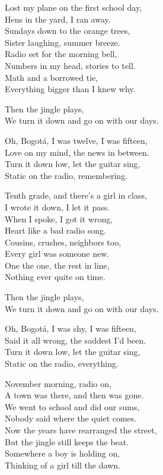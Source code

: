 \begin{lyrics}
Lost my plane on the first school day,\\
Hens in the yard, I ran away.\\
Sundays down to the orange trees,\\
Sister laughing, summer breeze.\\
Radio set for the morning bell,\\
Numbers in my head, stories to tell.\\
Math and a borrowed tie,\\
Everything bigger than I knew why.

Then the jingle plays,\\
We turn it down and go on with our days.

Oh, Bogotá, I was twelve, I was fifteen,\\
Love on my mind, the news in between.\\
Turn it down low, let the guitar sing,\\
Static on the radio, remembering.

Tenth grade, and there’s a girl in class,\\
I wrote it down, I let it pass.\\
When I spoke, I got it wrong,\\
Heart like a bad radio song.\\
Cousins, crushes, neighbors too,\\
Every girl was someone new.\\
One the one, the rest in line,\\
Nothing ever quite on time.

Then the jingle plays,\\
We turn it down and go on with our days.

Oh, Bogotá, I was shy, I was fifteen,\\
Said it all wrong, the saddest I’d been.\\
Turn it down low, let the guitar sing,\\
Static on the radio, everything.

November morning, radio on,\\
A town was there, and then was gone.\\
We went to school and did our sums,\\
Nobody said where the quiet comes.\\
Now the years have rearranged the street,\\
But the jingle still keeps the beat.\\
Somewhere a boy is holding on,\\
Thinking of a girl till the dawn.


\end{lyrics}
